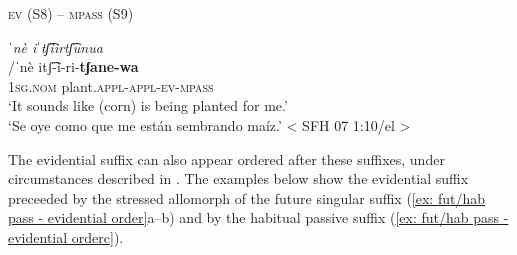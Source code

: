     \z
\z


\ea\label{ex: S8-S9 affix order}
{\textsc{ev} (S8) -- \textsc{mpass} (S9)}

    \textit{ˈnè  iˈtʃ͡ìirtʃ͡unua}\\
    \gll    /ˈnè  itʃ͡-ì-ri-\textbf{tʃane-wa}\\
            1\textsc{sg.nom}  plant.\textsc{appl-appl-{ev-mpass}}\\
    \glt    ‘It sounds like (corn) is being planted for me.’   \\
    \glt    ‘Se oye como que me están sembrando maíz.’   < SFH 07 1:10/el >\\

\z

The evidential suffix can also appear ordered after these suffixes, under circumstances described in \citet{caballero2010scope}. The examples below show the evidential suffix preceeded by the stressed allomorph of the future singular suffix (\ref{ex: fut/hab pass -  evidential order}a--b) and by the habitual passive suffix (\ref{ex: fut/hab pass -  evidential orderc}).


